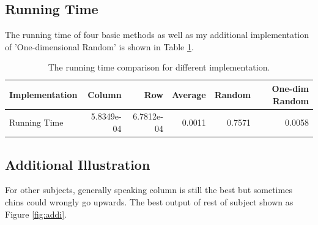 \documentclass[a4paper]{article}
\begin{document}
\subsection{Running Time}
The running time of four basic methods as well as my additional implementation of 'One-dimensional Random' is shown in Table \ref{tab:runtime}.

\begin{table}[h!]
\centering
\begin{tabular}{l|rrrrr}
Implementation & Column & Row & Average & Random & One-dim Random \\\hline
Running Time & 5.8349e-04 & 6.7812e-04 & 0.0011 & 0.7571 & 0.0058 \\
\end{tabular}
\caption{\label{tab:runtime}The running time comparison for different implementation.}
\end{table}

\subsection{Additional Illustration}
For other subjects, generally speaking column is still the best but sometimes chins could wrongly go upwards. The best output of rest of subject shown as Figure \ref{fig:addi}.
\end{document}
